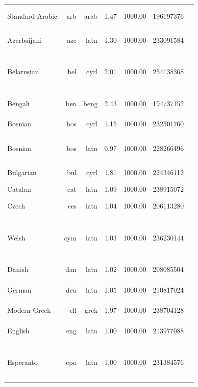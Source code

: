 \documentclass[11pt]{article}
\begin{document}
\begin{center}
\begin{longtable}[width=0.9\textwidth]{|lrrrrrl|}
Standard Arabic & arb & arab & 1.47 & 1000.00 & 196197376 & {\color{oscar}\rule{3.99cm}{8pt}}{\color{other}\rule{0.009999999999999787cm}{8pt}} \\ 
Azerbaijani & aze & latn & 1.30 & 1000.00 & 233091584 & {\color{oscar}\rule{0.74cm}{8pt}}{\color{glot500}\rule{3.26cm}{8pt}} \\ 
Belarusian & bel & cyrl & 2.01 & 1000.00 & 254138368 & {\color{oscar}\rule{0.6cm}{8pt}}{\color{madlad400}\rule{2.63cm}{8pt}}{\color{glot500}\rule{0.76cm}{8pt}}{\color{other}\rule{0.009999999999999787cm}{8pt}} \\ 
Bengali & ben & beng & 2.43 & 1000.00 & 194737152 & {\color{oscar}\rule{3.98cm}{8pt}}{\color{other}\rule{0.020000000000000018cm}{8pt}} \\ 
Bosnian & bos & cyrl & 1.15 & 1000.00 & 232501760 & {\color{madlad400}\rule{4.0cm}{8pt}} \\ 
Bosnian & bos & latn & 0.97 & 1000.00 & 228266496 & {\color{nllb}\rule{0.71cm}{8pt}}{\color{glot500}\rule{2.84cm}{8pt}}{\color{other}\rule{0.4500000000000002cm}{8pt}} \\ 
Bulgarian & bul & cyrl & 1.81 & 1000.00 & 224346112 & {\color{oscar}\rule{4.0cm}{8pt}} \\ 
Catalan & cat & latn & 1.09 & 1000.00 & 238915072 & {\color{oscar}\rule{4.0cm}{8pt}} \\ 
Czech & ces & latn & 1.04 & 1000.00 & 206113280 & {\color{oscar}\rule{4.0cm}{8pt}}{\color{other}\rule{0.0cm}{8pt}} \\ 
Welsh & cym & latn & 1.03 & 1000.00 & 236230144 & {\color{oscar}\rule{0.29cm}{8pt}}{\color{nllb}\rule{0.31cm}{8pt}}{\color{madlad400}\rule{2.75cm}{8pt}}{\color{glot500}\rule{0.4cm}{8pt}}{\color{other}\rule{0.25cm}{8pt}} \\ 
Danish & dan & latn & 1.02 & 1000.00 & 208085504 & {\color{oscar}\rule{4.0cm}{8pt}}{\color{other}\rule{0.0cm}{8pt}} \\ 
German & deu & latn & 1.05 & 1000.00 & 210817024 & {\color{oscar}\rule{3.99cm}{8pt}}{\color{other}\rule{0.009999999999999787cm}{8pt}} \\ 
Modern Greek & ell & grek & 1.97 & 1000.00 & 238704128 & {\color{oscar}\rule{4.0cm}{8pt}} \\ 
English & eng & latn & 1.00 & 1000.00 & 213977088 & {\color{oscar}\rule{3.98cm}{8pt}}{\color{other}\rule{0.020000000000000018cm}{8pt}} \\ 
Esperanto & epo & latn & 1.00 & 1000.00 & 231384576 & {\color{oscar}\rule{0.58cm}{8pt}}{\color{nllb}\rule{1.33cm}{8pt}}{\color{glot500}\rule{1.52cm}{8pt}}{\color{other}\rule{0.5699999999999998cm}{8pt}} \\ 

\end{longtable}
\end{center}
\end{document}
